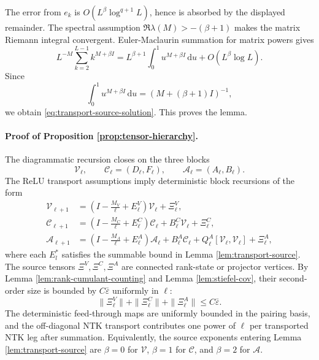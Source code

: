 \documentclass{article}
\newcommand{\barE}{\bar\varepsilon}
\newcommand{\dd}{\mathrm d}
\begin{document}
The error from \(e_k\) is \(O(L^\beta\log^{q+1}L)\), hence is absorbed by the displayed remainder. The spectral assumption \(\Re\lambda(M)>-(\beta+1)\) makes the matrix Riemann integral convergent. Euler-Maclaurin summation for matrix powers gives
\begin{equation}
L^{-M}\sum_{k=2}^{L-1}k^{M+\beta I}
=
L^{\beta+1}\int_0^1 u^{M+\beta I}\,\dd u
+O(L^\beta\log L).
\label{eq:appendix-matrix-riemann}
\end{equation}
Since
\[
\int_0^1 u^{M+\beta I}\,\dd u
=
\left(M+(\beta+1)I\right)^{-1},
\]
we obtain \eqref{eq:transport-source-solution}. This proves the lemma.

\paragraph{Proof of Proposition \ref{prop:tensor-hierarchy}.}
The diagrammatic recursion closes on the three blocks
\[
\mathcal V_\ell,\qquad \mathcal C_\ell=(D_\ell,F_\ell),\qquad \mathcal A_\ell=(A_\ell,B_\ell).
\]
The ReLU transport assumptions imply deterministic block recursions of the form
\begin{align}
\mathcal V_{\ell+1}
&=
\left(I-\frac{M_V}{\ell}+E^V_\ell\right)\mathcal V_\ell
+\Xi^V_\ell,
\label{eq:appendix-rigorous-V}\\
\mathcal C_{\ell+1}
&=
\left(I-\frac{M_C}{\ell}+E^C_\ell\right)\mathcal C_\ell
+B^C_\ell\mathcal V_\ell
+\Xi^C_\ell,
\label{eq:appendix-rigorous-C}\\
\mathcal A_{\ell+1}
&=
\left(I-\frac{M_A}{\ell}+E^A_\ell\right)\mathcal A_\ell
+B^A_\ell\mathcal C_\ell
+Q^A_\ell[\mathcal V_\ell,\mathcal V_\ell]
+\Xi^A_\ell,
\label{eq:appendix-rigorous-A}
\end{align}
where each \(E^*_l\) satisfies the summable bound in Lemma \ref{lem:transport-source}. The source tensors \(\Xi^V,\Xi^C,\Xi^A\) are connected rank-state or projector vertices. By Lemma \ref{lem:rank-cumulant-counting} and Lemma \ref{lem:stiefel-cov}, their second-order size is bounded by \(C\barE\) uniformly in \(\ell\):
\begin{equation}
\|\Xi^V_\ell\|+\|\Xi^C_\ell\|+\|\Xi^A_\ell\|
\le C\barE.
\label{eq:appendix-source-bound}
\end{equation}
The deterministic feed-through maps are uniformly bounded in the pairing basis, and the off-diagonal NTK transport contributes one power of \(\ell\) per transported NTK leg after summation. Equivalently, the source exponents entering Lemma \ref{lem:transport-source} are \(\beta=0\) for \(\mathcal V\), \(\beta=1\) for \(\mathcal C\), and \(\beta=2\) for \(\mathcal A\).
\end{document}
